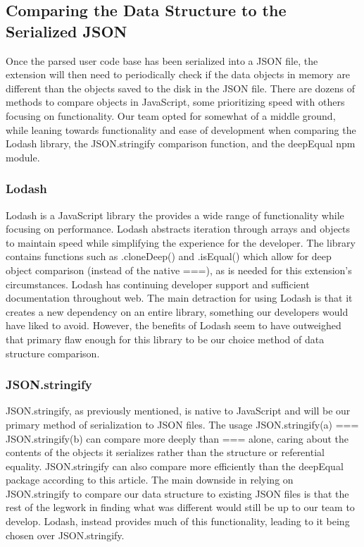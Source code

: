 \documentclass[letterpaper,10pt,titlepage,draftclsnofoot,onecolumn,onesided] {IEEEtran}
\begin{document}
\subsection{Comparing the Data Structure to the Serialized JSON}
Once the parsed user code base has been serialized into a JSON file, the extension will then need to periodically check if the data objects in memory are different than the objects saved to the disk in the JSON file. 
There are dozens of methods to compare objects in JavaScript, some prioritizing speed with others focusing on functionality. Our team opted for somewhat of a middle ground, while leaning towards functionality and ease of development when comparing the Lodash library, the JSON.stringify comparison function, and the deepEqual npm module.

\subsubsection{Lodash}
Lodash is a JavaScript library the provides a wide range of functionality while focusing on performance.
Lodash abstracts iteration through arrays and objects to maintain speed while simplifying the experience for the developer. 
The library contains functions such as .cloneDeep() and .isEqual() which allow for deep object comparison (instead of the native ===), as is needed for this extension's circumstances. 
Lodash has continuing developer support and sufficient documentation throughout web. 
The main detraction for using Lodash is that it creates a new dependency on an entire library, something our developers would have liked to avoid. 
However, the benefits of Lodash seem to have outweighed that primary flaw enough for this library to be our choice method of data structure comparison. \cite{lodash}

\subsubsection{JSON.stringify}
JSON.stringify, as previously mentioned, is native to JavaScript and will be our primary method of serialization to JSON files. 
The usage JSON.stringify(a) === JSON.stringify(b) can compare more deeply than === alone, caring about the contents of the objects it serializes rather than the structure or referential equality. 
JSON.stringify can also compare more efficiently than the deepEqual package according to this article. \cite{compare}
The main downside in relying on JSON.stringify to compare our data structure to existing JSON files is that the rest of the legwork in finding what was different would still be up to our team to develop. 
Lodash, instead provides much of this functionality, leading to it being chosen over JSON.stringify. \cite{stringify}
\end{document}
